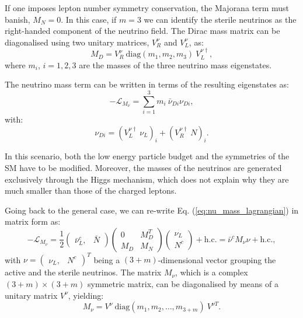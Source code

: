 If one imposes lepton number symmetry conservation, the Majorana term must banish, $M_{N}=0$. In this case, if $m=3$ we can identify the sterile neutrinos as the right-handed component of the neutrino field. The Dirac mass matrix can be diagonalised using two unitary matrices, $V^{\nu}_{R}$ and $V^{\nu}_{L}$, as:
\begin{equation}
	M_{D} = V^{\nu}_{R}~\mathrm{diag}(m_{1}, m_{2}, m_{3})~V^{\nu \dagger}_{L},
\end{equation}
where $m_{i}$, $i=1,2,3$ are the masses of the three neutrino mass eigenstates.

The neutrino mass term can be written in terms of the resulting eigenstates as:
\begin{equation}
	-\mathcal{L}_{M_{\nu}} = \sum_{i=1}^{3} m_{i}~\bar{\nu}_{Di} \nu_{Di},
\end{equation}
with:
\begin{equation}
	\nu_{Di} = \left(V^{\nu \dagger}_{L}~\nu_{L}\right)_{i} + \left(V^{\nu \dagger}_{R}~N\right)_{i}.
\end{equation}

In this scenario, both the low energy particle budget and the symmetries of the SM have to be modified. Moreover, the masses of the neutrinos are generated exclusively through the Higgs mechanism, which does not explain why they are much smaller than those of the charged leptons.

Going back to the general case, we can re-write Eq. (\ref{eq:nu_mass_lagrangian}) in matrix form as:
\begin{equation}
	-\mathcal{L}_{M_{\nu}} = \frac{1}{2} \begin{pmatrix}\bar{\nu}^{c}_{L},&\bar{N}\end{pmatrix} \begin{pmatrix}0 & M_{D}^{T}\\M_{D} & M_{N}\end{pmatrix}\begin{pmatrix}\nu_{L}\\N^{c}\end{pmatrix} + \mathrm{h.c.} = \bar{\nu}^{c} M_{\nu} \nu + \mathrm{h.c.},
\end{equation}
with $\nu=\begin{pmatrix}\nu_{L}, & N^{c}\end{pmatrix}^{T}$ being a $(3+m)$-dimensional vector grouping the active and the sterile neutrinos. The matrix $M_{\nu}$, which is a complex $(3+m)\times(3+m)$ symmetric matrix, can be diagonalised by means of a unitary matrix $V^{\nu}$, yielding:
\begin{equation}
	M_{\nu} = V^{\nu}~\mathrm{diag}(m_{1}, m_{2}, \dots, m_{3+m})~V^{\nu T}.
\end{equation}

